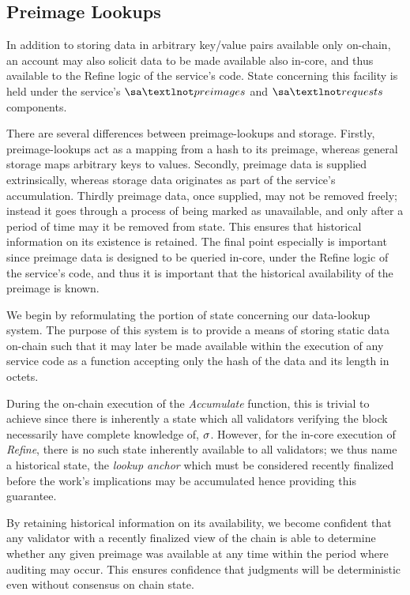 \subsection{Preimage Lookups}\label{sec:lookups}

In addition to storing data in arbitrary key/value pairs available only on-chain, an account may also solicit data to be made available also in-core, and thus available to the Refine logic of the service's code. State concerning this facility is held under the service's $\sa¬preimages$ and $\sa¬requests$ components.

There are several differences between preimage-lookups and storage. Firstly, preimage-lookups act as a mapping from a hash to its preimage, whereas general storage maps arbitrary keys to values. Secondly, preimage data is supplied extrinsically, whereas storage data originates as part of the service's accumulation. Thirdly preimage data, once supplied, may not be removed freely; instead it goes through a process of being marked as unavailable, and only after a period of time may it be removed from state. This ensures that historical information on its existence is retained. The final point especially is important since preimage data is designed to be queried in-core, under the Refine logic of the service's code, and thus it is important that the historical availability of the preimage is known.

We begin by reformulating the portion of state concerning our data-lookup system. The purpose of this system is to provide a means of storing static data on-chain such that it may later be made available within the execution of any service code as a function accepting only the hash of the data and its length in octets.

During the on-chain execution of the \emph{Accumulate} function, this is trivial to achieve since there is inherently a state which all validators verifying the block necessarily have complete knowledge of, \ie $\sigma$. However, for the in-core execution of \emph{Refine}, there is no such state inherently available to all validators; we thus name a historical state, the \emph{lookup anchor} which must be considered recently finalized before the work's implications may be accumulated hence providing this guarantee.

By retaining historical information on its availability, we become confident that any validator with a recently finalized view of the chain is able to determine whether any given preimage was available at any time within the period where auditing may occur. This ensures confidence that judgments will be deterministic even without consensus on chain state.

